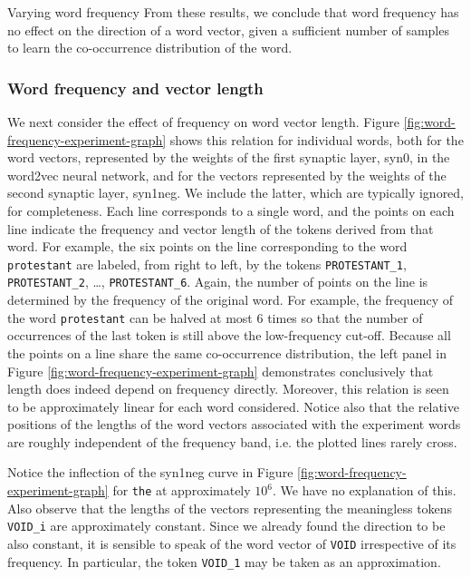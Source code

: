\documentclass{article} %
\newcommand{\word}[1]{\texttt{#1}}
\begin{document}
\begin{section}{Varying word frequency}
From these results, we conclude that word frequency has no effect on the
direction of a word vector, given a sufficient number of samples to
learn the co-occurrence distribution of the word.

\subsubsection{Word frequency and vector length}
We next consider the effect of frequency on word vector length.
Figure \ref{fig:word-frequency-experiment-graph} shows this relation for
individual words, both for the word vectors, represented by the weights
of the first synaptic layer, syn0, in the word2vec neural network, and
for the vectors represented by the weights of the second synaptic layer,
syn1neg.  We include the latter, which are typically ignored, for
completeness.  Each line corresponds to a single word, and the points on
each line indicate the frequency and vector length of the tokens derived
from that word.  For example, the six points on the line corresponding
to the word \word{protestant} are labeled, from right to left, by the
tokens \word{PROTESTANT\_1}, \word{PROTESTANT\_2}, \dots,
\word{PROTESTANT\_6}.  Again, the number of points on the line is
determined by the frequency of the original word.  For example, the
frequency of the word \word{protestant} can be halved at most $6$ times
so that the number of occurrences of the last token is still above the
low-frequency cut-off.  Because all the points on a line share the same
co-occurrence distribution, the left panel in
Figure \ref{fig:word-frequency-experiment-graph} demonstrates conclusively
that length does indeed depend on frequency directly.  Moreover, this
relation is seen to be approximately linear for each word considered.
Notice also that the relative positions of the lengths of the word vectors associated
with the experiment words are roughly independent of the frequency band,
i.e. the plotted lines rarely cross.

Notice the inflection of the syn1neg curve in
Figure \ref{fig:word-frequency-experiment-graph} for \word{the} at
approximately $10^6$.  We have no explanation of this.  Also observe
that the lengths of the vectors representing the meaningless tokens
\word{VOID\_i} are approximately constant.  Since we already found the
direction to be also constant, it is sensible to speak of the word
vector of \word{VOID} irrespective of its frequency.  In particular, the
token \word{VOID\_1} may be taken as an approximation.


\end{section}
\end{document}
